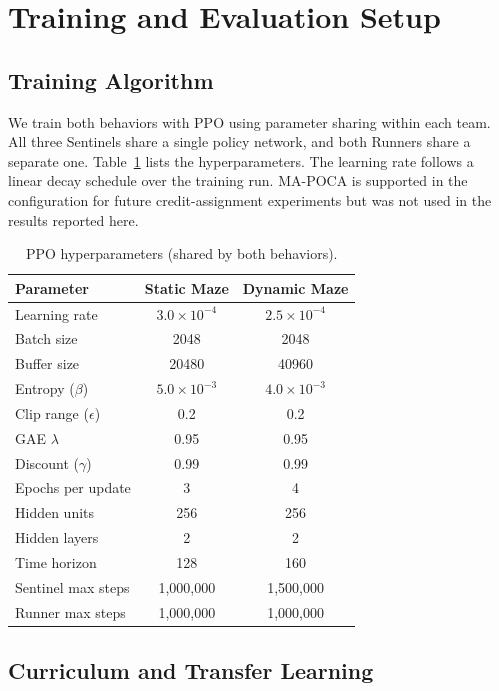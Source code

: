 \documentclass[conference]{IEEEtran}
\begin{document}
\section{Training and Evaluation Setup}

\subsection{Training Algorithm}

We train both behaviors with PPO using parameter sharing within each team. All three Sentinels share a single policy network, and both Runners share a separate one. Table~\ref{tab:hyperparams} lists the hyperparameters. The learning rate follows a linear decay schedule over the training run. MA-POCA is supported in the configuration for future credit-assignment experiments but was not used in the results reported here.

\begin{table}[t]
\centering
\caption{PPO hyperparameters (shared by both behaviors).}
\label{tab:hyperparams}
\begin{tabular}{lcc}
\toprule
Parameter & Static Maze & Dynamic Maze \\
\midrule
Learning rate & $3.0{\times}10^{-4}$ & $2.5{\times}10^{-4}$ \\
Batch size & 2048 & 2048 \\
Buffer size & 20480 & 40960 \\
Entropy ($\beta$) & $5.0{\times}10^{-3}$ & $4.0{\times}10^{-3}$ \\
Clip range ($\epsilon$) & 0.2 & 0.2 \\
GAE $\lambda$ & 0.95 & 0.95 \\
Discount ($\gamma$) & 0.99 & 0.99 \\
Epochs per update & 3 & 4 \\
Hidden units & 256 & 256 \\
Hidden layers & 2 & 2 \\
Time horizon & 128 & 160 \\
Sentinel max steps & 1{,}000{,}000 & 1{,}500{,}000 \\
Runner max steps & 1{,}000{,}000 & 1{,}000{,}000 \\
\bottomrule
\end{tabular}
\end{table}

\subsection{Curriculum and Transfer Learning}
\end{document}
